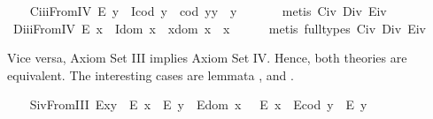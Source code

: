 \begin{isabellebody}
%
\endisadelimproof
\ \ \isamarkupfalse%
\ C\isactrlsub i\isactrlsub i\isactrlsub iFromIV{\isacharcolon}\ {\isachardoublequoteopen}E\ y\ \isactrlbold {\isasymrightarrow}\ {\isacharparenleft}I{\isacharparenleft}cod\ y{\isacharparenright}\ \isactrlbold {\isasymand}\ {\isacharparenleft}cod\ y{\isacharparenright}{\isasymcdot}y\ {\isasymcong}\ y{\isacharparenright}{\isachardoublequoteclose}\ \isanewline
%
\isadelimproof
\ \ \ \ %
\endisadelimproof
%
\isatagproof
{}\isamarkupfalse%
\ {\isacharparenleft}metis\ C\isactrlsub i\isactrlsub v\ D\isactrlsub i\isactrlsub v\ E\isactrlsub i\isactrlsub v{\isacharparenright}%
\endisatagproof
{\isafoldproof}%
%
\isadelimproof
\isanewline
%
\endisadelimproof
\ \ \isamarkupfalse%
\ D\isactrlsub i\isactrlsub i\isactrlsub iFromIV{\isacharcolon}\ {\isachardoublequoteopen}E\ x\ \isactrlbold {\isasymrightarrow}\ {\isacharparenleft}I{\isacharparenleft}dom\ x{\isacharparenright}\ \isactrlbold {\isasymand}\ x{\isasymcdot}{\isacharparenleft}dom\ x{\isacharparenright}\ {\isasymcong}\ x{\isacharparenright}{\isachardoublequoteclose}\isanewline
%
\isadelimproof
\ \ \ \ %
\endisadelimproof
%
\isatagproof
{}\isamarkupfalse%
\ {\isacharparenleft}metis\ {\isacharparenleft}full{\isacharunderscore}types{\isacharparenright}\ C\isactrlsub i\isactrlsub v\ D\isactrlsub i\isactrlsub v\ E\isactrlsub i\isactrlsub v{\isacharparenright}%
\endisatagproof
{\isafoldproof}%
%
\isadelimproof
%
\endisadelimproof
%
\begin{isamarkuptext}%
Vice versa, Axiom Set III implies Axiom Set IV. Hence, both theories are
 equivalent. The interesting cases are lemmata , 
 and .%
\end{isamarkuptext}\isamarkuptrue%
\isanewline
\ \ \isamarkupfalse%
\ S\isactrlsub i\isactrlsub vFromIII{\isacharcolon}\ {\isachardoublequoteopen}{\isacharparenleft}E{\isacharparenleft}x{\isasymcdot}y{\isacharparenright}\ \isactrlbold {\isasymrightarrow}\ {\isacharparenleft}E\ x\ \isactrlbold {\isasymand}\ E\ y{\isacharparenright}{\isacharparenright}\ \isactrlbold {\isasymand}\ {\isacharparenleft}E{\isacharparenleft}dom\ x\ {\isacharparenright}\ \isactrlbold {\isasymrightarrow}\ E\ x{\isacharparenright}\ \isactrlbold {\isasymand}\ {\isacharparenleft}E{\isacharparenleft}cod\ y{\isacharparenright}\ \isactrlbold {\isasymrightarrow}\ E\ y{\isacharparenright}{\isachardoublequoteclose}\ \ \isanewline
%
\isadelimproof
\ \ \ \ %
\endisadelimproof

\end{isabellebody}
